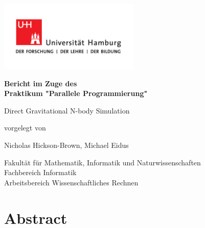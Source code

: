 \documentclass[
	12pt,
	a4paper,
	BCOR10mm,
	DIV14,
	headsepline,
	usegeometry,
]{scrreprt}
\begin{document}

\begin{titlepage}
	\includegraphics[width=0.5\textwidth]{UHH-Logo_2010_Farbe_CMYK}

	\begin{center}
		{\Large \textcolor{uhhred}{\textbf{Bericht im Zuge des \\ Praktikum "Parallele Programmierung" }}\par}

		\vspace{1cm}

		{\titlefont\huge Direct Gravitational N-body Simulation\par}

		\vspace{1cm}

		{\large vorgelegt von\par}

		\vspace{0.5cm}

		{\large Nicholas Hickson-Brown, Michael Eidus\par}
		
		\vspace{1cm}
		
		{\large Fakultät für Mathematik, Informatik und Naturwissenschaften\\
			Fachbereich Informatik\\
			Arbeitsbereich Wissenschaftliches Rechnen \par}
	\end{center}

\end{titlepage}

\restoregeometry

\chapter*{Abstract}

\thispagestyle{empty}

\tableofcontents
\end{document}
